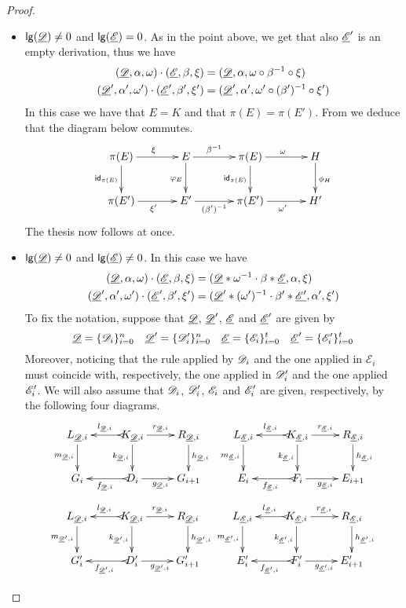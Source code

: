 \begin{proof}
\begin{itemize}
		\item $\mathsf{lg}(\underline{\mathscr{D}})\neq 0$ and $\mathsf{lg}(\underline{\mathscr{E}})= 0$. As in the point above, we get that also $\underline{\mathscr{E}}'$  is an empty derivation, thus we have
		\begin{align*}
			(\underline{\mathscr{D}}, \alpha, \omega)\cdot (\underline{\mathscr{E}}, \beta, \xi)&=(\underline{\mathscr{D}},  \alpha, \omega \circ \beta^{-1}\circ \xi)\\
			(\underline{\mathscr{D}}', \alpha', \omega')\cdot (\underline{\mathscr{E}}', \beta', \xi')&=(\underline{\mathscr{D}}',  \alpha', \omega' \circ (\beta')^{-1}\circ \xi')
		\end{align*}
		In this case we have that $E=K$ and that $\pi(E)=\pi(E')$. From  we deduce that the diagram below commutes.
		\[\xymatrix@C=35pt{\pi(E) \ar[r]^{\xi} \ar[d]_{\id{\pi(E)}}& E  \ar[d]_{\varphi_E}\ar[r]^-{\beta^{-1}} & \pi(E) \ar[d]_{\id{\pi(E)}} \ar[r]^{\omega}& H \ar[d]^{\phi_H}\\\pi(E') \ar[r]_{\xi'}& E' \ar[r]_-{(\beta')^{-1}} & \pi(E') \ar[r]_{\omega'} & H'}\]
		The thesis now follows at once.
		\item $\mathsf{lg}(\underline{\mathscr{D}})\neq 0$ and $\mathsf{lg}(\underline{\mathscr{E}})\neq 0$. In this case we have
		\begin{align*}
			(\underline{\mathscr{D}}, \alpha, \omega)\cdot (\underline{\mathscr{E}}, \beta, \xi)&=(\underline{\mathscr{D}}*\omega^{-1}\cdot \beta*\underline{\mathscr{E}}, \alpha, \xi)\\
			(\underline{\mathscr{D}}', \alpha', \omega')\cdot (\underline{\mathscr{E}}', \beta', \xi')&=(\underline{\mathscr{D}}'*(\omega')^{-1}\cdot \beta'*\underline{\mathscr{E'}}, \alpha', \xi')
		\end{align*}
		To fix the notation, suppose that $\underline{\mathscr{D}}$, $\underline{\mathscr{D}}'$, $\underline{\mathscr{E}}$ and $\underline{\mathscr{E}}'$ are given by
		\[\underline{\mathscr{D}}=\{\mathscr{D}_i\}_{i=0}^n \quad \underline{\mathscr{D}}'=\{\mathscr{D}'_i\}_{i=0}^n \quad \underline{\mathscr{E}}=\{\mathscr{E}_i\}_{i=0}^t \quad \underline{\mathscr{E}}'=\{\mathscr{E}'_i\}_{i=0}^t\]
		Moreover, noticing that the rule applied by $\mathscr{D}_i$ and the one applied in $\mathcal{E}_i$  must coincide with, respectively, the one applied in $\mathscr{D}'_i$ and the one applied $\mathscr{E}'_i$. We will also assume that $\mathscr{D}_i$, $\mathscr{D}'_i$, $\mathscr{E}_i$ and $\mathscr{E}'_i$ are given, respectively, by the following four diagrams. 
		\[\xymatrix{L_{\der{D},i} \ar[d]_{m_{\der{D}, i}}& K_{\der{D},i} \ar[d]_{k_{\der{D}, i}} \ar[r]^{r_{\der{D},i}} \ar@{>->}[l]_{l_{\der{D},i}} & R_{\der{D},i}\ar[d]^{h_{\der{D}, i}} &L_{\der{E},i} \ar[d]_{m_{\der{E}, i}}& K_{\der{E},i} \ar[d]_{k_{\der{E}, i}} \ar[r]^{r_{\der{E},i}} \ar@{>->}[l]_{l_{\der{E},i}} & R_{\der{E},i}\ar[d]^{h_{\der{E}, i}} \\G_i & D_i \ar[r]_{g_{\der{D},i}} \ar@{>->}[l]^{f_{\der{D},i}} & G_{i+1} & E_i & F_i\ar[r]_{g_{\der{E},i}} \ar@{>->}[l]^{f_{\der{E},i}}  & E_{i+1}}\]
		\[\xymatrix{L_{\der{D},i} \ar[d]_{m_{\der{D}', i}}& K_{\der{D},i} \ar[d]_{k_{\der{D}', i}} \ar[r]^{r_{\der{D},i}} \ar@{>->}[l]_{l_{\der{D},i}} & R_{\der{D},i}\ar[d]^{h_{\der{D}', i}} &L_{\der{E},i} \ar[d]_{m_{\der{E}', i}}& K_{\der{E},i} \ar[d]_{k_{\der{E}', i}} \ar[r]^{r_{\der{E},i}} \ar@{>->}[l]_{l_{\der{E},i}} & R_{\der{E},i}\ar[d]^{h_{\der{E}', i}} \\G'_i & D'_i \ar[r]_{g_{\der{D}',i}} \ar@{>->}[l]^{f_{\der{D}',i}} & G'_{i+1} & E'_i & F'_i\ar[r]_{g_{\der{E}',i}} \ar@{>->}[l]^{f_{\der{E}',i}}  & E'_{i+1}}\]
		

\end{itemize}
\end{proof}
